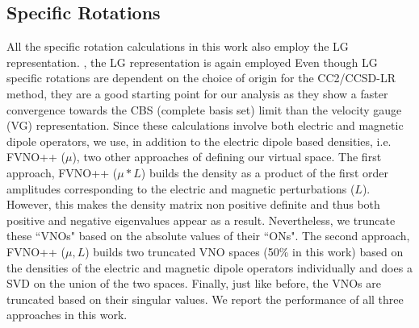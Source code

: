 \subsection{Specific Rotations}
All the specific rotation calculations in this work also employ the LG representation.
, the LG representation is again employed
Even though LG specific rotations are dependent on the choice of origin for the CC2/CCSD-LR method,
they are a good starting point for our analysis as they show a faster convergence towards the CBS 
(complete basis set) limit than the velocity gauge (VG) representation. Since these calculations 
involve both electric and magnetic dipole operators, we use, in addition to the electric dipole 
based densities, i.e. FVNO++ ($\mu$), two other approaches of defining our virtual space.
The first approach, FVNO++ ($\mu*L$) builds the density as a product of the first order amplitudes corresponding
to the electric and magnetic perturbations ($L$). However, this makes the density matrix non positive 
definite and thus both positive and negative eigenvalues appear as a result. Nevertheless, we truncate 
these ``VNOs" based on the absolute values of their ``ONs". The second approach, FVNO++ ($\mu,L$) builds two truncated VNO 
spaces (50\% in this work) based on the densities of the electric and magnetic dipole operators individually and does a SVD on 
the union of the two spaces. Finally, just like before, the VNOs are truncated based on their singular values.
We report the performance of all three approaches in this work.
%
%
%
